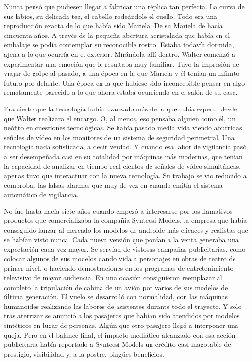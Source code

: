 Nunca pensó que pudiesen llegar a fabricar una réplica tan perfecta. La curva de sus labios, su delicada tez, el cabello rodeándole el cuello. Todo era una reproducción exacta de lo que había sido Mariela. De su Mariela de hacía cincuenta años. A través de la pequeña abertura acristalada que había en el embalaje se podía contemplar su reconocible rostro. Estaba todavía dormida, ajena a lo que ocurría en el exterior. Mirándola allí dentro, Walter comenzó a experimentar una emoción que le resultaba muy familiar. Tuvo la impresión de viajar de golpe al pasado, a una época en la que Mariela y él tenían un infinito futuro por delante. Una época en la que hubiese sido inconcebible pensar en algo remotamente parecido a lo que ahora estaba ocurriendo en el salón de su casa.

Era cierto que la tecnología había avanzado más de lo que cabía esperar desde que Walter realizara el encargo. O, al menos, eso pensaba alguien como él, un neófito en cuestiones tecnológicas. Se había pasado media vida viendo aburridas señales de vídeo en los monitores de un sistema de seguridad perimetral. Una tecnología nada sofisticada, a decir verdad. Y cuando esa labor de vigilancia pasó a ser desempeñada casi en su totalidad por máquinas más modernas, que tenían la capacidad de analizar en tiempo real cientos de señales de vídeo simultáneas, apenas tuvo que interactuar con la nueva tecnología. Su trabajo se vio reducido a comprobar las falsas alarmas que muy de vez en cuando emitía el sistema automático de vigilancia.

No fue hasta hacía siete años cuando empezó a interesarse por los llamativos productos que comercializaba la compañía Synteesi-Models, la empresa que había conseguido lanzar al mercado los modelos de androide más eficaces y realistas que se habían visto nunca. Cada nueva versión que ponían a la venta generaba una expectación cada vez mayor. Se servían de vistosas campañas publicitarias, como colocar algunos de sus modelos dando vida a personajes en obras de teatro de primer nivel, o haciendo demostraciones en los programas de entretenimiento televisivo de mayor audiencia. En una ocasión consiguieron reemplazar al completo la tripulación de cabina de un avión por varios de sus modelos de última generación. El vuelo se desarrolló con normalidad, con las máquinas humanoides realizando las labores de asistentes durante todo el trayecto. Y solo tras aterrizar se anunció a los pasajeros que habían sido atendidos por modelos sintéticos en lugar de personas. Algún que otro pasajero llegó a interponer una queja. Pero en el balance final, el impacto mediático alcanzado con esa acción publicitaria había reportado a Synteesi-Models un crédito casi inagotable de prestigio, visibilidad y, a la postre, pingües beneficios.

